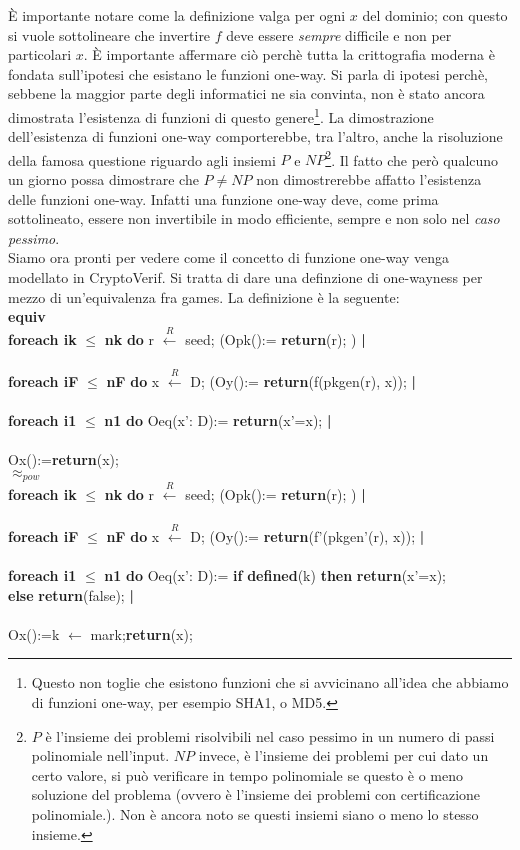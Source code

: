 \documentclass[a4paper,openright,twoside,12pt]{report}
\newcommand{\foreach}[2]{\textbf{foreach #1} $\leq$ \textbf{#2} \textbf{do}}
\newcommand{\return}[1]{\textbf{return}(#1);}
\newcommand{\pipe}{ \textbf{|} \\ \\}
\newcommand{\setR}[2]{#1 $\xleftarrow{R}$ #2;}
\newcommand{\set}[2]{#1 $\leftarrow$ #2;}
\newcommand{\ifthen}[2]{\textbf{if} #1 \textbf{then} #2}
\newcommand{\equiva}{\textbf{equiv}}
\begin{document}
\`E importante notare come la definizione valga per ogni $x$ del dominio; con questo si vuole sottolineare che invertire $f$ deve essere \emph{sempre} difficile e non per particolari $x$.
\`E importante affermare ci\`o perch\`e tutta la crittografia moderna \`e fondata sull'ipotesi che esistano le funzioni one-way.
Si parla di ipotesi perch\`e, sebbene la maggior parte degli informatici ne sia convinta, non \`e stato ancora dimostrata l'esistenza di funzioni di questo genere\footnote{Questo non toglie
che esistono funzioni che si avvicinano all'idea che abbiamo di funzioni one-way, per esempio SHA1, o MD5.}.
La dimostrazione dell'esistenza di funzioni one-way comporterebbe, tra l'altro, anche la risoluzione della famosa questione riguardo agli insiemi
$P$ e $NP$\footnote{$P$ \`e l'insieme dei problemi risolvibili nel caso pessimo in un numero di passi polinomiale nell'input. $NP$ invece, \`e l'insieme dei problemi per cui dato un certo valore, 
si pu\`o verificare in tempo polinomiale se questo \`e o meno soluzione del problema (ovvero \`e l'insieme dei problemi con certificazione polinomiale.). 
Non \`e ancora noto se questi insiemi siano o meno lo stesso insieme.}.
Il fatto che però qualcuno un giorno possa dimostrare che $P \neq NP$ non dimostrerebbe affatto l'esistenza delle funzioni one-way. 
Infatti una funzione one-way deve, come prima sottolineato, essere non invertibile in modo efficiente, sempre e non solo nel \emph{caso pessimo}. \\ 
Siamo ora pronti per vedere come il concetto di funzione one-way venga modellato in CryptoVerif.
Si tratta di dare una definzione di one-wayness per mezzo di un'equivalenza fra games. La definizione \`e la seguente:\\
\equiva \\
\foreach{ik}{nk} \setR{r}{seed} (Opk():= \return{r} )\pipe 
 \foreach{iF}{nF} \setR{x}{D} (Oy():= \return{f(pkgen(r), x)} \pipe
  \foreach{i1}{n1} Oeq(x': D):= \return{x'=x} \pipe 
    Ox():=\return{x} \\
\textbf{$\approx _{pow}$}\\
\foreach{ik}{nk} \setR{r}{seed} (Opk():= \return{r} )\pipe 
 \foreach{iF}{nF} \setR{x}{D} (Oy():= \return{f'(pkgen'(r), x)} \pipe
  \foreach{i1}{n1} Oeq(x': D):= \ifthen{\textbf{defined}(k)}{\return{x'=x}} \\ \textbf{else}  \return{false} \pipe 
    Ox():=\set{k}{mark}\return{x} \\
\end{document}
